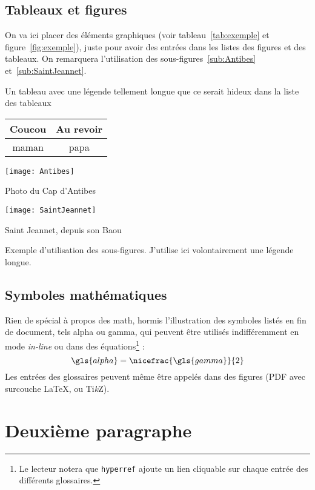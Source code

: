 	\subsection{Tableaux et figures}
	On va ici placer des éléments graphiques (voir tableau~\ref{tab:exemple} et figure~\ref{fig:exemple}), juste pour avoir des entrées dans les listes des figures et des tableaux. On remarquera l'utilisation des sous-figures~\ref{sub:Antibes} et~\ref{sub:SaintJeannet}.
	
	\begin{tableth}
		\caption[Légende courte pour l'exemple de tableau]{Un tableau avec une légende tellement longue que ce serait hideux dans la liste des tableaux}
			\label{tab:exemple}
		\begin{tabular}{c|c}
			Coucou	& Au revoir\\
			\hline
			maman	& papa
		\end{tabular}
	\end{tableth}

	\begin{figureth}
		\begin{subfigureth}{0.4\textwidth}
			\texttt{[image: Antibes]}
			\caption{Photo du Cap d'Antibes}
				\label{sub:Antibes}
		\end{subfigureth}
		\begin{subfigureth}{0.4\textwidth}
			\texttt{[image: SaintJeannet]}
			\caption{Saint Jeannet, depuis son Baou}
				\label{sub:SaintJeannet}
		\end{subfigureth}
		\caption[Légende courte pour la figure]{Exemple d'utilisation des sous-figures. J'utilise ici volontairement une légende longue.}		
			\label{fig:exemple}
	\end{figureth}
	
	\subsection{Symboles mathématiques}
	Rien de spécial à propos des math, hormis l'illustration des symboles listés en fin de document, tels \gls{alpha} ou \gls{gamma}, qui peuvent être utilisés indifféremment en mode \emph{in-line} ou dans des équations\footnote{Le lecteur notera que \texttt{hyperref} ajoute un lien cliquable sur chaque entrée des différents glossaires.} :
	\begin{equation}
		\gls{alpha}=\nicefrac{\gls{gamma}}{2}
		\label{eq:alphagamma}
	\end{equation}
Les entrées des glossaires peuvent même être appelés dans des figures (PDF avec surcouche \LaTeX, ou Ti\textit{k}Z).
	

\section{Deuxième paragraphe}
\blindtext


